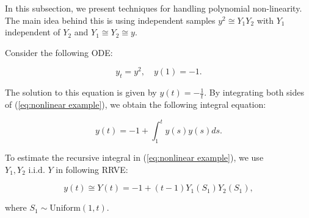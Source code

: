 \documentclass[a4paper,12pt]{article}
\begin{document}
In this subsection, we present techniques for handling polynomial non-linearity.
The main idea behind this is using independent samples
$y^{2} \cong Y_{1} Y_{2}$ with $Y_{1}$ independent of $ Y_{2}$ and
$Y_{1} \cong Y_{2} \cong y$.


\begin{example}[$y_t=y^{2}$] \label{ex:nonlinear example}
  Consider the following ODE:

  \begin{equation} \label{eq:nonlinear example}
    y_t = y^2, \quad y(1) = -1.
  \end{equation}

  The solution to this equation is given by $y(t) = -\frac{1}{t}$.
  By integrating both sides of (\ref{eq:nonlinear example}),
  we obtain the following integral equation:

  \begin{equation}
    y(t) = -1 + \int_{1}^{t} y(s) y(s)ds.
  \end{equation}

  To estimate the recursive integral in (\ref{eq:nonlinear example}),
  we use  $Y_1,Y_2 \text{ i.i.d. } Y$ in following RRVE:

  \begin{equation} \label{RRVE: nonlinear example}
    y(t) \cong Y(t) = -1 + (t-1) Y_1(S_{1}) Y_2(S_{1}),
  \end{equation}

  where $S_{1} \sim \text{Uniform}(1,t)$.
\end{example}

\end{document}
